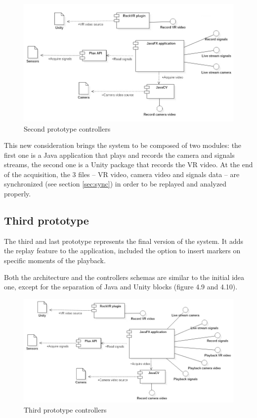 \documentclass[binding=0.6cm,LaM]{sapthesis}
\begin{document}
\begin{figure}[h]
\centering
\includegraphics[scale=.47]{images/prot2_controllers2}
\caption{Second prototype controllers}
\end{figure}

This new consideration brings the system to be composed of two modules: the first one is a Java application that plays and records the camera and signals streams, the second one is a Unity package that records the VR video.
At the end of the acquisition, the 3 files – VR video, camera video and signals data – are synchronized (see section \ref{sec:sync}) in order to be replayed and analyzed properly.

\subsection{Third prototype}
The third and last prototype represents the final version of the system. It adds the replay feature to the application, included the option to insert markers on specific moments of the playback. 

Both the architecture and the controllers schemas are similar to the initial idea one, except for the separation of Java and Unity blocks (figure 4.9 and 4.10). 

\begin{figure}[h]
\centering
\includegraphics[scale=.44]{images/prot3_controllers2}
\caption{Third prototype controllers}
\end{figure}
\end{document}
